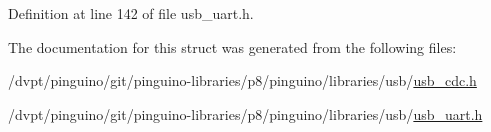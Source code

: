 Definition at line 142 of file usb\-\_\-uart.\-h.



The documentation for this struct was generated from the following files\-:\begin{DoxyCompactItemize}
\item 
/dvpt/pinguino/git/pinguino-\/libraries/p8/pinguino/libraries/usb/\hyperlink{usb__cdc_8h}{usb\-\_\-cdc.\-h}\item 
/dvpt/pinguino/git/pinguino-\/libraries/p8/pinguino/libraries/usb/\hyperlink{usb__uart_8h}{usb\-\_\-uart.\-h}\end{DoxyCompactItemize}
